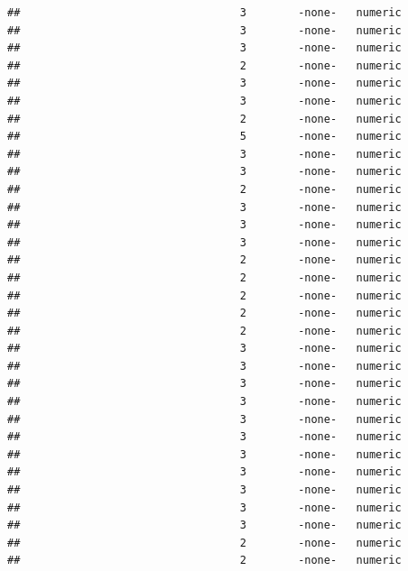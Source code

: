 \documentclass[
  12pt,
]{article}
\begin{document}
\begin{verbatim}
##                                  3        -none-   numeric                    
##                                  3        -none-   numeric                    
##                                  3        -none-   numeric                    
##                                  2        -none-   numeric                    
##                                  3        -none-   numeric                    
##                                  3        -none-   numeric                    
##                                  2        -none-   numeric                    
##                                  5        -none-   numeric                    
##                                  3        -none-   numeric                    
##                                  3        -none-   numeric                    
##                                  2        -none-   numeric                    
##                                  3        -none-   numeric                    
##                                  3        -none-   numeric                    
##                                  3        -none-   numeric                    
##                                  2        -none-   numeric                    
##                                  2        -none-   numeric                    
##                                  2        -none-   numeric                    
##                                  2        -none-   numeric                    
##                                  2        -none-   numeric                    
##                                  3        -none-   numeric                    
##                                  3        -none-   numeric                    
##                                  3        -none-   numeric                    
##                                  3        -none-   numeric                    
##                                  3        -none-   numeric                    
##                                  3        -none-   numeric                    
##                                  3        -none-   numeric                    
##                                  3        -none-   numeric                    
##                                  3        -none-   numeric                    
##                                  3        -none-   numeric                    
##                                  3        -none-   numeric                    
##                                  2        -none-   numeric                    
##                                  2        -none-   numeric                    

\end{verbatim}
\end{document}

